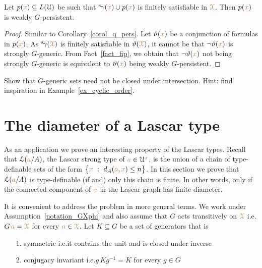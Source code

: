 \begin{corollary}\label{corol_q_w_pers}
  Let $p({\color{brown} x})\subseteq L(\EuScript U)$ be such that ${}^{\rm s}\kern-.2ex\gamma({\color{brown} x})\cup p({\color{brown} x})$ is finitely satisfiable in ${\color{brown}\EuScript X}$.
  Then $p({\color{brown} x})$ is weakly $G$-persistent.
\end{corollary}

\begin{proof}
  Similar to Corollary~\ref{corol_q_pers}.
  Let $\vartheta({\color{brown} x})$ be a conjunction of formulas in $p({\color{brown} x})$.
  As ${}^{\rm s}\kern-.2ex\gamma({\color{brown}\EuScript X})$ is finitely satisfiable in $\vartheta({\color{brown}\EuScript X})$, it cannot be that $\neg\vartheta({\color{brown} x})$ is strongly $G$-generic.
  From Fact~\ref{fact_fip}, we obtain that $\neg\vartheta({\color{brown} x})$ not being strongly $G$-generic is equivalent to $\vartheta({\color{brown} x})$  being weakly $G$-persistent.
\end{proof}

\begin{exercise}
  Show that $G$-generic sets need not be closed under intersection.
  Hint: find inspiration in Example~\ref{ex_cyclic_order}.
\end{exercise}

\section{The diameter of a Lascar type}\label{newelski}

As an application we prove an interesting property of the Lascar types.
Recall that $\EuScript L({\color{brown} a}/A)$, the Lascar strong type of ${\color{brown} a}\in\EuScript U^{\color{brown} x}$, is the union of a chain of type-definable sets of the form $\big\{{\color{brown} x}\ :\ d_A({\color{brown} a},{\color{brown} x})\le n\big\}$.
In this section we prove that $\EuScript L({\color{brown} a}/A)$ is type-definable (if and) only this chain is finite.
In other words, only if the connected component of ${\color{brown} a}$ in the Lascar graph has finite diameter.

It is convenient to address the problem in more general terms.
We work under Assumption~\ref{notation_GXphi} and also assume that $G$ acts transitively on ${\color{brown}\EuScript X}$ i.e.\@ $G\,{\color{brown} a}={\color{brown}\EuScript X}$ for every ${\color{brown} a}\in{\color{brown}\EuScript X}$.
Let $K\subseteq G$ be a set of generators that is
\begin{itemize}
  \item[1.] symmetric i.e.\@ it contains the unit and is closed under inverse
  \item[2.] conjugacy invariant i.e.\@ $g\,Kg^{-1}=K$ for every $g\in G$
\end{itemize}

